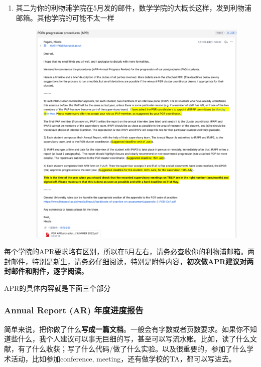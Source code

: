 \begin{enumerate}
    \item 
        \begin{minipage}{0.3\textwidth}
            其二为你的利物浦学院在5月发的邮件，数学学院的大概长这样，发到利物浦邮箱。其他学院的可能不太一样
        \end{minipage}
        \begin{minipage}{0.63\textwidth}
            \begin{figure}[H]
                \includegraphics[width=0.95\columnwidth, right]{author-folder/Kai.Wu/APR_liverpool_email.png}
            \end{figure}
        \end{minipage}

\end{enumerate}

每个学院的APR要求略有区别，所以在5月左右，请务必查收你的利物浦邮箱。两封邮件，特别是新生，请务必仔细阅读，特别是附件内容，\textbf{初次做APR建议对两封邮件和附件，逐字阅读}。

APR的具体内容就是下面三个部分
\subsubsection{Annual Report (AR) 年度进度报告}
简单来说，把你做了什么\textbf{写成一篇文档}。一般会有字数或者页数要求。如果你不知道些什么，我个人建议可以事无巨细的写，甚至可以写流水账。比如，读了什么文献，有了什么收获；写了什么代码/做了什么实验。以及很重要的，参加了什么学术活动，比如参加conference, meeting，还有做学校的TA，都可以写进去。
